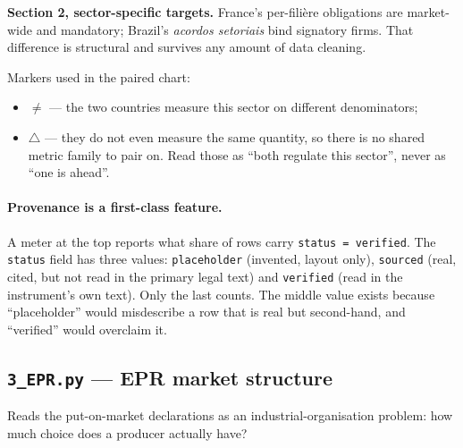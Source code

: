 \documentclass[11pt,a4paper]{article}
\newcommand{\file}[1]{\texttt{#1}}
\begin{document}
\textbf{Section 2, sector-specific targets.} France's per-filière obligations
are market-wide and mandatory; Brazil's \emph{acordos setoriais} bind signatory
firms. That difference is structural and survives any amount of data cleaning.

Markers used in the paired chart:

\begin{itemize}
  \item $\neq$ --- the two countries measure this sector on different
        denominators;
  \item $\triangle$ --- they do not even measure the same quantity, so there is
        no shared metric family to pair on. Read those as ``both regulate this
        sector'', never as ``one is ahead''.
\end{itemize}

\paragraph{Provenance is a first-class feature.} A meter at the top reports what
share of rows carry \file{status = verified}. The \file{status} field has three
values: \file{placeholder} (invented, layout only), \file{sourced} (real,
cited, but not read in the primary legal text) and \file{verified} (read in the
instrument's own text). Only the last counts. The middle value exists because
``placeholder'' would misdescribe a row that is real but second-hand, and
``verified'' would overclaim it.

\subsection{\file{3\_EPR.py} --- EPR market structure}

Reads the put-on-market declarations as an industrial-organisation problem: how
much choice does a producer actually have?
\end{document}

